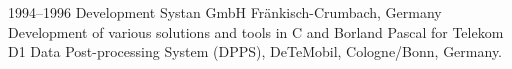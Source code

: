 \cventry
{1994--1996}
{Development}
{}
{Systan GmbH}
{Fränkisch-Crumbach, Germany}
{
  Development of various solutions and tools in C and Borland Pascal for Telekom D1
  Data Post-processing System (DPPS), DeTeMobil, Cologne/Bonn, Germany.
}
